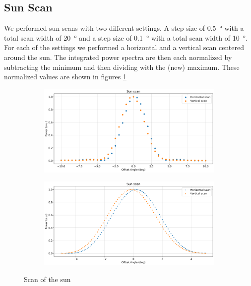 \subsection{Sun Scan}
We performed sun scans with two different settings.
A step size of \SI{0.5}{\degree} with a total scan width of \SI{20}{\degree} and a step size of \SI{0.1}{\degree} with a total scan width of \SI{10}{\degree}.
For each of the settings we performed a horizontal and a vertical scan centered around the sun.
The integrated power spectra are then each normalized by subtracting the minimum and then dividing with the (new) maximum.
These normalized values are shown in figures \ref{fig:sun_scan}

\begin{figure}[ht]
    \begin{subfigure}[t]{0.49\linewidth}
        \includegraphics[width=0.9\linewidth]{assets/sun_scan_low_res.png}
    \end{subfigure}
    \begin{subfigure}[t]{0.49\linewidth}
        \includegraphics[width=0.9\linewidth]{assets/sun_scan_high_res.png}
    \end{subfigure}
    \caption{Scan of the sun}
    \label{fig:sun_scan}
\end{figure}

